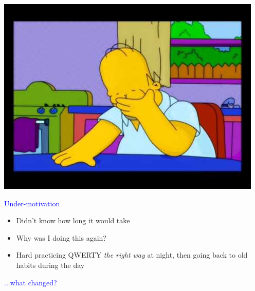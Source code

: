 \documentclass[landscape]{slides}
\begin{document}
\begin{slide}
    \includegraphics[width=\textwidth]{homer}
\end{slide}


\begin{slide}

    \textcolor{blue}{\Large{Under-motivation}}

    \begin{itemize}
        \item Didn't know how long it would take
        \item Why was I doing this again?
        \item Hard practicing QWERTY \emph{the right way} at night, then going back to old habits during the day
    \end{itemize}

\end{slide}


\begin{slide}

    \textcolor{blue}{\Large{...what changed?}}

\end{slide}
\end{document}
